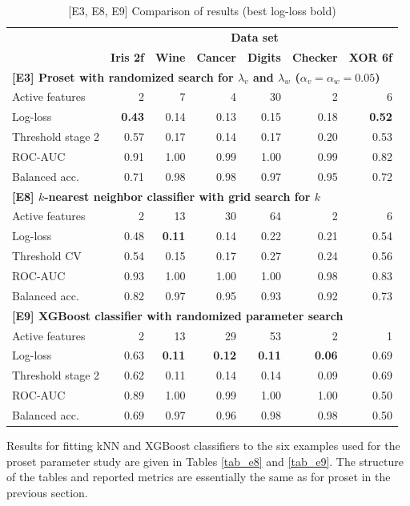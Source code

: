 %
\begin{table}
\caption{[E3, E8, E9] Comparison of results (best log-loss bold)}
\label{tab_e3_e8_e9}
%
\begin{center}
\small
\begin{tabular}{|lrrrrrr|}
\hline
&\multicolumn{6}{c|}{\textbf{\hrulefill\ Data set \hrulefill}}\\
&\textbf{Iris 2f}&\textbf{Wine}&\textbf{Cancer}&\textbf{Digits}&\textbf{Checker}&\textbf{XOR 6f}\\
\multicolumn{7}{|l|}{\textbf{[E3] Proset with randomized search for $\lambda_v$ and $\lambda_w$ ($\alpha_v=\alpha_w=0.05$)}}\\
Active features&2&7&4&30&2&6\\
Log-loss&\textbf{0.43}&0.14&0.13&0.15&0.18&\textbf{0.52}\\
Threshold stage 2&0.57&0.17&0.14&0.17&0.20&0.53\\
ROC-AUC&0.91&1.00&0.99&1.00&0.99&0.82\\
Balanced acc.&0.71&0.98&0.98&0.97&0.95&0.72\\
\multicolumn{7}{|l|}{\textbf{[E8] $k$-nearest neighbor classifier with grid search for $k$}}\\
Active features&2&13&30&64&2&6\\
Log-loss&0.48&\textbf{0.11}&0.14&0.22&0.21&0.54\\
Threshold CV&0.54&0.15&0.17&0.27&0.24&0.56\\
ROC-AUC&0.93&1.00&1.00&1.00&0.98&0.83\\
Balanced acc.&0.82&0.97&0.95&0.93&0.92&0.73\\
\multicolumn{7}{|l|}{\textbf{[E9] XGBoost classifier with randomized parameter search}}\\
Active features&2&13&29&53&2&1\\
Log-loss&0.63&\textbf{0.11}&\textbf{0.12}&\textbf{0.11}&\textbf{0.06}&0.69\\
Threshold stage 2&0.62&0.11&0.14&0.14&0.09&0.69\\
ROC-AUC&0.89&1.00&0.99&1.00&1.00&0.50\\
Balanced acc.&0.69&0.97&0.96&0.98&0.98&0.50\\
\hline
\end{tabular}
\end{center}
\end{table}
%
Results for fitting kNN and XGBoost classifiers to the six examples used for the proset parameter study are given in Tables \ref{tab_e8} and \ref{tab_e9}.
The structure of the tables and reported metrics are essentially the same as for proset in the previous section.
